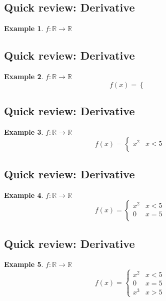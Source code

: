 \documentclass[twocolumn,20pt,fleqn]{extarticle}
\theoremstyle{plain}
\theoremstyle{definition}
\newtheorem*{example}{Example}
\theoremstyle{remark}
\begin{document}
\clearpage



\subsection{Quick review: Derivative}
\begin{example}
  $f : \mathbb{R}\to \mathbb{R}$\end{example}


\clearpage



\subsection{Quick review: Derivative}
\begin{example}
  $f : \mathbb{R}\to \mathbb{R}$
  \[f(x) =
      \begin{cases}
       \end{cases}\]\end{example}


\clearpage



\subsection{Quick review: Derivative}
\begin{example}
  $f : \mathbb{R}\to \mathbb{R}$
  \[f(x) =
      \begin{cases}
        x^2 & x < 5\\
       \end{cases}\]\end{example}


\clearpage



\subsection{Quick review: Derivative}
\begin{example}
  $f : \mathbb{R}\to \mathbb{R}$
  \[f(x) =
      \begin{cases}
        x^2 & x < 5\\
        0 & x = 5\\
       \end{cases}\]\end{example}


\clearpage



\subsection{Quick review: Derivative}
\begin{example}
  $f : \mathbb{R}\to \mathbb{R}$
  \[f(x) =
      \begin{cases}
        x^2 & x < 5\\
        0 & x = 5\\
        x^3 & x > 5
      \end{cases}
      \]
      \end{example}
\end{document}
